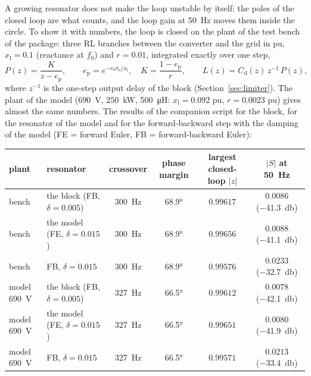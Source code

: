 \documentclass[11pt,a4paper]{scrartcl}
\newcommand{\ped}[1]{_{\mathrm{#1}}}
\begin{document}
\begin{onehalfspace}
A growing resonator does not make the loop unstable by itself: the poles of the closed loop are what counts, and the loop gain at \SI{50}{\hertz} moves them inside the circle. To show it with numbers, the loop is closed on the plant of the test bench of the package: three RL branches between the converter and the grid in pu, $x\ped{l} = 0.1$ (reactance at $f\ped{0}$) and $r = 0.01$, integrated exactly over one step,
\begin{equation}
	P(z) = \frac{K}{z - e\ped{p}}, \qquad e\ped{p} = e^{-r\omega t\ped{s}/x\ped{l}}, \quad K = \frac{1 - e\ped{p}}{r}, \qquad L(z) = C\ped{d}(z)\, z^{-1}\, P(z),
	\label{eq:loop}
\end{equation}
where $z^{-1}$ is the one-step output delay of the block (Section~\ref{sec:limiter}). The plant of the model (\SI{690}{\volt}, \SI{250}{\kilo\watt}, \SI{500}{\micro\henry}: $x\ped{l} = 0.092$ pu, $r = 0.0023$ pu) gives almost the same numbers. The results of the companion script for the block, for the resonator of the model and for the forward-backward step with the damping of the model (FE = forward Euler, FB = forward-backward Euler):
\begin{center}
	\footnotesize
	\setlength{\tabcolsep}{4pt}
	\begin{tabular}{@{} l l c c c c @{}}
		\toprule
		plant & resonator & crossover & phase margin & largest closed-loop $|z|$ & $|S|$ at \SI{50}{\hertz} \\
		\midrule
		bench & the block (FB, $\delta = 0.005$) & \SI{300}{\hertz} & \ang{68.9} & $0.99617$ & $0.0086$ (\SI{-41.3}{\decibel}) \\
		bench & the model (FE, $\delta = 0.015$) & \SI{300}{\hertz} & \ang{68.9} & $0.99656$ & $0.0088$ (\SI{-41.1}{\decibel}) \\
		bench & FB, $\delta = 0.015$ & \SI{300}{\hertz} & \ang{68.9} & $0.99576$ & $0.0233$ (\SI{-32.7}{\decibel}) \\
		model \SI{690}{\volt} & the block (FB, $\delta = 0.005$) & \SI{327}{\hertz} & \ang{66.5} & $0.99612$ & $0.0078$ (\SI{-42.1}{\decibel}) \\
		model \SI{690}{\volt} & the model (FE, $\delta = 0.015$) & \SI{327}{\hertz} & \ang{66.5} & $0.99651$ & $0.0080$ (\SI{-41.9}{\decibel}) \\
		model \SI{690}{\volt} & FB, $\delta = 0.015$ & \SI{327}{\hertz} & \ang{66.5} & $0.99571$ & $0.0213$ (\SI{-33.4}{\decibel}) \\
		\bottomrule
	\end{tabular}
\end{center}

\end{onehalfspace}
\end{document}
